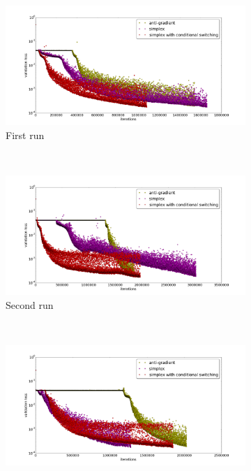 \begin{figure}
	\begin{subfigure}{1.\textwidth}
		\centering
		\includegraphics[width= 1\textwidth]{chapter4/compare_add_simplex_13.png}
		\caption{First run}
		\label{fig:a:comparisong_add_simplex}
	\end{subfigure}\\
	\begin{subfigure}{1.\textwidth}
		\centering
		\includegraphics[width= 1\textwidth]{chapter4/compare_add_simplex_14.png}
		\caption{Second run}
		\label{fig:b:comparisong_add_simplex}
	\end{subfigure}\\
	\begin{subfigure}{1.\textwidth}
		\centering
		\includegraphics[width= 1\textwidth]{chapter4/compare_add_simplex_15.png}

\end{subfigure}
\end{figure}
